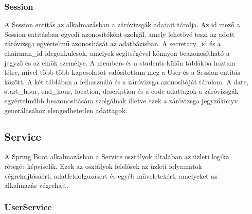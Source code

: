 \subsubsection{Session}

A Session entitás az alkalmazásban a záróvizsgák adatait tárolja. Az id mező a Session entitásban egyedi azonosítóként szolgál, amely lehetővé teszi az adott záróvizsga egyértelmű azonosítását az adatbázisban. A secretary\_id és a chairman\_id idegenkulcsok, amelyek segítségével könnyen beazonosítható a jegyző és az elnök személye. A members és a students külön táblákba hoztam létre, mivel több-több kapcsolatot valósítottam meg a User és a Session entitás között. A két táblában a felhasználó és a záróvizsga azonosítóját tárolom. A date, start\_hour, end\_hour, location, description és a code adattagok a záróvizsgák egyértelműbb beazonosítására szolgálnak illetve ezek a záróvizsga jegyzőkönyv generálásához elengedhetetlen adattagok.

\newpage
\subsection{Service}

A Spring Boot alkalmazásban a Service osztályok általában az üzleti logika rétegét képviselik. Ezek az osztályok felelősek az üzleti folyamatok végrehajtásáért, adatfeldolgozásért és egyéb műveletekért, amelyeket az alkalmazás végrehajt.

\subsubsection{UserService}

